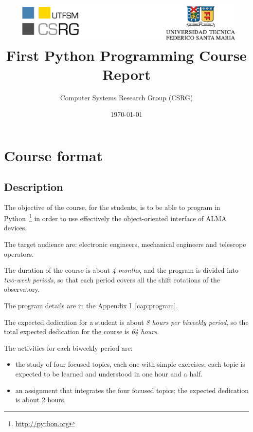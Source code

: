 \documentclass[letter, 10pt]{article}
\begin{document}
\title{\includegraphics[width=0.9\textwidth]{img/logos.pdf}\\\vspace{1cm}
First Python Programming Course Report}
\author{Computer Systems Research Group (CSRG)}
\date{\today}

\maketitle

\section{Course format}

\subsection{Description}

The objective of the course, for the students,
is to be able to program in Python~\footnote{\url{http://python.org}}
in order to use effectively the object-oriented interface of ALMA devices.

The target audience are: electronic engineers, mechanical engineers and telescope operators. 

The duration of the course is about \emph{4 months}, and the program is divided into \emph{two-week periods},
so that each period covers all the shift rotations of the observatory.

The program details are in the Appendix I~\ref{cap:program}.

The expected dedication for a student is about \emph{8 hours per biweekly period},
so the total expected dedication for the course is \emph{64 hours}.

The activities for each biweekly period are:
\begin{itemize}
    \item the study of four focused topics, each one with simple exercises;
          each topic is expected to be learned and understood in one hour and a half.
    \item an assignment that integrates the four focused topics;
          the expected dedication is about 2 hours.
\end{itemize}
\end{document}
